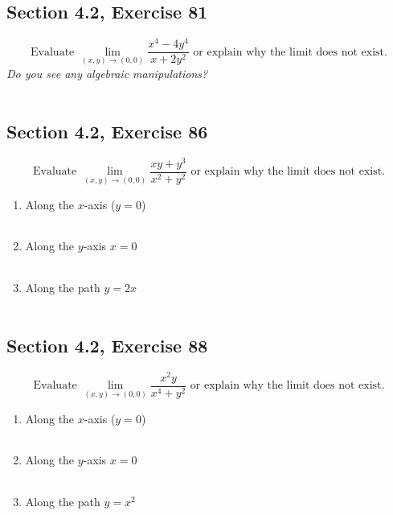 \documentclass[]{mangos-musings}
\begin{document}
\newpage
\subsection{Section 4.2, Exercise 81}
\[\text{Evaluate }\lim_{(x, y)\to(0, 0)} \dfrac{x^4 - 4y^4}{x + 2y^2} \text{ or explain why the limit does not exist.}\]
\textit{Do you see any algebraic manipulations?}
\begin{align*}
  \\ \\
\end{align*}

\subsection{Section 4.2, Exercise 86}
\[\text{Evaluate }\lim_{(x, y)\to(0, 0)} \dfrac{xy + y^3}{x^2 + y^2} \text{ or explain why the limit does not exist.}\]
\begin{enumerate}[label=(\alph*)]
  \item Along the $x$-axis ($y=0$)
  \begin{align*}
  \\ \\
  \end{align*}
  \item Along the $y$-axis $x = 0$
  \begin{align*}
  \\ \\
  \end{align*}
  \item Along the path $y = 2x$
  \begin{align*}
  \\ \\
  \end{align*}
\end{enumerate}

\subsection{Section 4.2, Exercise 88}
\[\text{Evaluate }\lim_{(x, y)\to(0, 0)}\dfrac{x^2y}{x^4 + y^2} \text{ or explain why the limit does not exist.}\]
\begin{enumerate}[label=(\alph*)]
  \item Along the $x$-axis ($y=0$)
  \begin{align*}
  \\ \\
  \end{align*}
  \item Along the $y$-axis $x = 0$
  \begin{align*}
  \\ \\
  \end{align*}
  \item Along the path $y = x^2$
  \begin{align*}
  \\ \\ \\
  \end{align*}
\end{enumerate}
\end{document}
